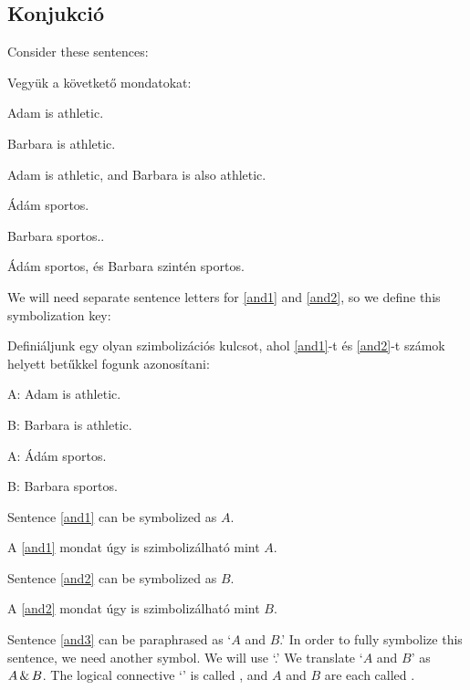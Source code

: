\subsection{Konjukció}

Consider these sentences:

Vegyük a követkető mondatokat:


\begin{earg}
\item[\ex{and1}]Adam is athletic.
\item[\ex{and2}]Barbara is athletic.
\item[\ex{and3}]Adam is athletic, and Barbara is also athletic.
\end{earg}

\begin{earg}
\item[\ex{and1}]Ádám sportos.
\item[\ex{and2}]Barbara sportos..
\item[\ex{and3}]Ádám sportos, és Barbara szintén sportos.
\end{earg}

We will need separate sentence letters for \ref{and1} and \ref{and2}, so we define this symbolization key:

Definiáljunk egy olyan szimbolizációs kulcsot, ahol \ref{and1}-t és \ref{and2}-t számok helyett betűkkel fogunk azonosítani:

\begin{ekey}
\item[A:] Adam is athletic.
\item[B:] Barbara is athletic.
\end{ekey}

\begin{ekey}
\item[A:] Ádám sportos.
\item[B:] Barbara sportos.
\end{ekey}

Sentence \ref{and1} can be symbolized as $A$.

A \ref{and1} mondat úgy is szimbolizálható mint $A$.

Sentence \ref{and2} can be symbolized as $B$.

A \ref{and2} mondat úgy is szimbolizálható mint $B$.

Sentence \ref{and3} can be paraphrased as `$A$ and $B$.'
In order to fully symbolize this sentence, we need another symbol. We will use `\eand.' 
We translate `$A$ and $B$' as $A\,\&\, B$.
The logical connective `\eand' is called , and $A$ and $B$ are each called .


